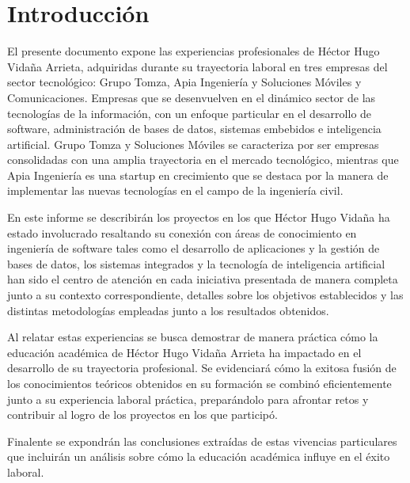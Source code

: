 \documentclass[final, fmstyle, 12pt]{article}
\begin{document}
\newpage
\section{Introducción}
\setlength{\parskip}{1em} 
El presente documento expone las experiencias profesionales de Héctor Hugo Vidaña Arrieta, 
adquiridas durante su trayectoria laboral en tres empresas del sector tecnológico: 
Grupo Tomza, Apia Ingeniería y Soluciones Móviles y Comunicaciones. 
Empresas que se desenvuelven en el dinámico sector de las tecnologías de la información, 
con un enfoque particular en el desarrollo de software, administración de bases de datos,
sistemas embebidos e inteligencia artificial. Grupo Tomza y Soluciones Móviles se caracteriza por ser empresas consolidadas con una amplia trayectoria en el mercado tecnológico, mientras que Apia Ingeniería es una startup en crecimiento que se destaca por la manera de implementar las nuevas tecnologías en el campo de la ingeniería civil.

En este informe se describirán los proyectos en los que Héctor Hugo Vidaña ha estado involucrado resaltando su conexión con áreas de conocimiento en ingeniería de software tales como el desarrollo de aplicaciones y la gestión de bases de datos,
los sistemas integrados y la tecnología de inteligencia artificial han sido el centro de atención en cada iniciativa presentada de manera completa junto a su contexto correspondiente, detalles sobre los objetivos establecidos y las distintas metodologías empleadas junto a los resultados obtenidos.

Al relatar estas experiencias se busca demostrar de manera práctica cómo la educación académica de Héctor Hugo Vidaña Arrieta ha impactado en el desarrollo de su trayectoria profesional. Se evidenciará cómo la exitosa fusión de los conocimientos teóricos obtenidos en su formación se combinó eficientemente junto a su experiencia laboral práctica, preparándolo para afrontar retos y contribuir al logro de los proyectos en los que participó. 

Finalente se expondrán las conclusiones extraídas de estas vivencias particulares que incluirán un análisis sobre cómo la educación académica influye en el éxito laboral.
\end{document}

